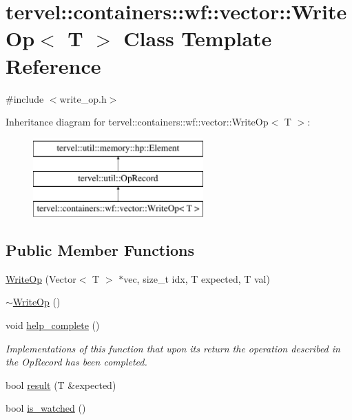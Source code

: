 \hypertarget{classtervel_1_1containers_1_1wf_1_1vector_1_1_write_op}{}\section{tervel\+:\+:containers\+:\+:wf\+:\+:vector\+:\+:Write\+Op$<$ T $>$ Class Template Reference}
\label{classtervel_1_1containers_1_1wf_1_1vector_1_1_write_op}


{\ttfamily \#include $<$write\+\_\+op.\+h$>$}

Inheritance diagram for tervel\+:\+:containers\+:\+:wf\+:\+:vector\+:\+:Write\+Op$<$ T $>$\+:\begin{figure}[H]
\begin{center}
\leavevmode
\includegraphics[height=3.000000cm]{classtervel_1_1containers_1_1wf_1_1vector_1_1_write_op}
\end{center}
\end{figure}
\subsection*{Public Member Functions}
\begin{DoxyCompactItemize}
\item 
\hyperlink{classtervel_1_1containers_1_1wf_1_1vector_1_1_write_op_a09e0c8cc62247a95e50e43a482df81fe}{Write\+Op} (Vector$<$ T $>$ $\ast$vec, size\+\_\+t idx, T expected, T val)
\item 
\hyperlink{classtervel_1_1containers_1_1wf_1_1vector_1_1_write_op_a80cc81812cda1b0b3d379e883106fb51}{$\sim$\+Write\+Op} ()
\item 
void \hyperlink{classtervel_1_1containers_1_1wf_1_1vector_1_1_write_op_a30f4a6d0e37b6e591fb986977304e08d}{help\+\_\+complete} ()
\begin{DoxyCompactList}\small\item\em Implementations of this function that upon its return the operation described in the Op\+Record has been completed. \end{DoxyCompactList}\item 
bool \hyperlink{classtervel_1_1containers_1_1wf_1_1vector_1_1_write_op_a972e53578716571f63bca13af4fe8f16}{result} (T \&expected)
\item 
bool \hyperlink{classtervel_1_1containers_1_1wf_1_1vector_1_1_write_op_ab9b31a254a96f4b7b04c3ae66bda8eca}{is\+\_\+watched} ()
\end{DoxyCompactItemize}
